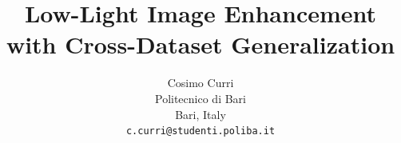 \documentclass[10pt,twocolumn,letterpaper]{article}
\title{Low-Light Image Enhancement with Cross-Dataset Generalization}
\author{
	Cosimo Curri\\
	Politecnico di Bari\\
	Bari, Italy\\
	{\tt\small c.curri@studenti.poliba.it}
}
\begin{document}
	\maketitle
	
	
	
	
	
	
	
	
	
	
	
	{
	    \small
	    
	    
	}
\end{document}
